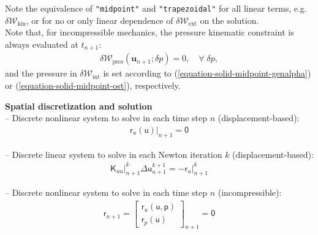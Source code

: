 \documentclass[a4paper,12pt]{report}
\newcommand{\bs}[1]{\boldsymbol{#1}}
\newcommand{\ROP}{\bs{\mathsf{r}}}
\begin{document}
Note the equivalence of \verb."midpoint". and \verb."trapezoidal". for all linear terms, e.g. $\delta \mathcal{W}_{\mathrm{kin}}$, or for no or only linear dependence of $\delta \mathcal{W}_{\mathrm{ext}}$ on the solution.\\

Note that, for incompressible mechanics, the pressure kinematic constraint is always evaluated at $t_{n+1}$:
\begin{equation}
\begin{aligned}
\delta \mathcal{W}_{\mathrm{pres}}(\boldsymbol{u}_{n+1};\delta p) = 0, \quad \forall \; \delta p,
\end{aligned}
\end{equation}
and the pressure in $\delta \mathcal{W}_{\mathrm{int}}$ is set according to (\ref{equation-solid-midpoint-genalpha}) or (\ref{equation-solid-midpoint-ost}), respectively.

\textbf{Spatial discretization and solution}\\

-- Discrete nonlinear system to solve in each time step $n$ (displacement-based):
\begin{equation}
\label{equation-nonlin-sys-solid}
\begin{aligned}
\left.\ROP_{u}(\boldsymbol{\mathsf{u}})\right|_{n+1} = \boldsymbol{\mathsf{0}}
\end{aligned}
\end{equation}

-- Discrete linear system to solve in each Newton iteration $k$ (displacement-based):
\begin{equation}
\label{equation-lin-sys-solid}
\begin{aligned}
\left. \boldsymbol{\mathsf{K}}_{uu} \right|_{n+1}^{k} \Delta\boldsymbol{\mathsf{u}}_{n+1}^{k+1}=-\left. \ROP_{u} \right|_{n+1}^{k}
\end{aligned}
\end{equation}

-- Discrete nonlinear system to solve in each time step $n$ (incompressible):
\begin{equation}
\label{equation-nonlin-sys-solid-inc}
\begin{aligned}
\ROP_{n+1} = \begin{bmatrix} \ROP_{u}(\boldsymbol{\mathsf{u}},\boldsymbol{\mathsf{p}}) \\ \ROP_{p}(\boldsymbol{\mathsf{u}}) \end{bmatrix}_{n+1} = \boldsymbol{\mathsf{0}}
\end{aligned}
\end{equation}
\end{document}
